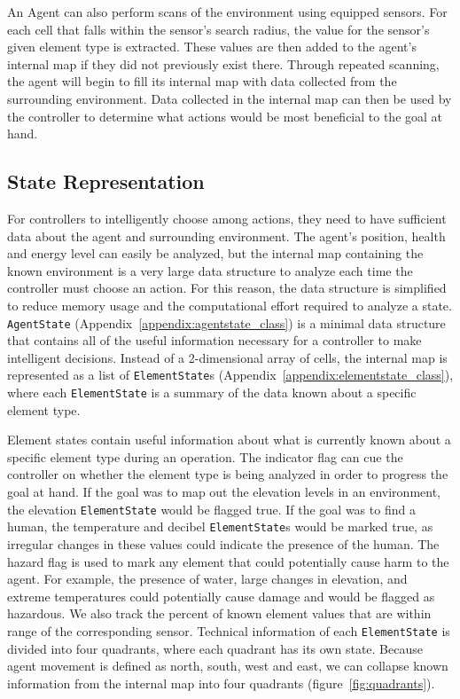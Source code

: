 An Agent can also perform scans of the environment using equipped sensors.
For each cell that falls within the sensor's search radius, the value for the sensor's given element type is extracted.
These values are then added to the agent's internal map if they did not previously exist there.
Through repeated scanning, the agent will begin to fill its internal map with data collected from the surrounding environment.
Data collected in the internal map can then be used by the controller to determine what actions would be most beneficial to the goal at hand.


\subsection{State Representation} \label{subsec:state_representation}
For controllers to intelligently choose among actions, they need to have sufficient data about the agent and surrounding environment.
The agent's position, health and energy level can easily be analyzed, but the internal map containing the known environment is a very large data structure to analyze each time the controller must choose an action.
For this reason, the data structure is simplified to reduce memory usage and the computational effort required to analyze a state.
\texttt{AgentState} (Appendix~\ref{appendix:agentstate_class}) is a minimal data structure that contains all of the useful information necessary for a controller to make intelligent decisions.
Instead of a 2-dimensional array of cells, the internal map is represented as a list of \texttt{ElementState}s (Appendix~\ref{appendix:elementstate_class}), where each \texttt{ElementState} is a summary of the data known about a specific element type.

Element states contain useful information about what is currently known about a specific element type during an operation.
The indicator flag can cue the controller on whether the element type is being analyzed in order to progress the goal at hand.
If the goal was to map out the elevation levels in an environment, the elevation \texttt{ElementState} would be flagged true.
If the goal was to find a human, the temperature and decibel \texttt{ElementState}s would be marked true, as irregular changes in these values could indicate the presence of the human.
The hazard flag is used to mark any element that could potentially cause harm to the agent.
For example, the presence of water, large changes in elevation, and extreme temperatures could potentially cause damage and would be flagged as hazardous.
We also track the percent of known element values that are within range of the corresponding sensor.
Technical information of each \texttt{ElementState} is divided into four quadrants, where each quadrant has its own state.
Because agent movement is defined as north, south, west and east, we can collapse known information from the internal map into four quadrants (figure~\ref{fig:quadrants}).

